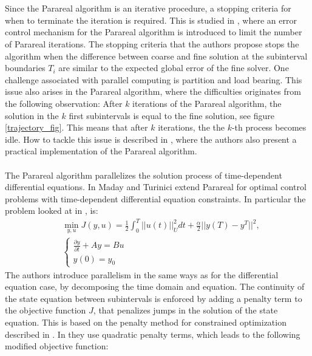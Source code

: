 \\
\\
Since the Parareal algorithm is an iterative procedure, a stopping criteria for when to terminate the iteration is required. This is studied in \cite{lepsa2010efficient}, where an error control mechanism for the Parareal algorithm is introduced to limit the number of Parareal iterations. The stopping criteria that the authors propose stops the algorithm when the difference between coarse and fine solution at the subinterval boundaries $T_i$ are similar to the expected global error of the fine solver. One challenge associated with parallel computing is partition and load bearing. This issue also arises in the Parareal algorithm, where the difficulties originates from the following observation: After $k$ iterations of the Parareal algorithm, the solution in  the $k$ first subintervals is equal to the fine solution, see figure \ref{trajectory_fig}. This means that after $k$ iterations, the the $k$-th process becomes idle. How to tackle this issue is described in \cite{aubanel2011scheduling}, where the authors also present a practical implementation of the Parareal algorithm.
\\
\\
The Parareal algorithm parallelizes the solution process of time-dependent differential equations. In \cite{maday2002parareal} Maday and Turinici extend Parareal for optimal control problems with time-dependent differential equation constraints. In particular the problem looked at in \cite{maday2002parareal}, is: 
\begin{align*}
&\min_{y,u}J(y,u) = \frac{1}{2}\int_0^T||u(t)||_U^2dt + \frac{\alpha}{2}||y(T)-y^T||^2,\\
&\left\{
     \begin{array}{lr}
       	\frac{\partial y}{\partial t}+Ay = Bu\\
       	   y(0)=y_0
     \end{array}
   \right.
\end{align*}
The authors introduce parallelism in the same ways as for the differential equation case, by decomposing the time domain and equation. The continuity of the state equation between subintervals is enforced by adding a penalty term to the objective function $J$, that penalizes jumps in the solution of the state equation. This is based on the penalty method for constrained optimization described in \cite{nocedal2006numerical}. In \cite{maday2002parareal} they use quadratic penalty terms, which leads to the following modified objective function:
